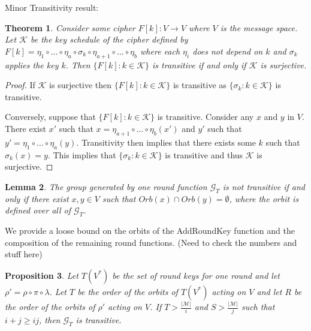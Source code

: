 \documentclass[11pt]{amsart}
\newcommand{\KK}{\mathcal{K}}
\newcommand{\MM}{\mathcal{M}}
\newcommand{\GG}{\mathcal{G}}
\newtheorem{theorem}{{\bf Theorem }}
\newtheorem{lemma}[theorem]{{\bf Lemma }}
\newtheorem{proposition}[theorem]{{\bf Proposition}}
\begin{document}
Minor Transitivity result:
\begin{theorem}
Consider some cipher $F[k]: V \to V$ where $V$ is the message space. Let $\KK$ be the key schedule of the cipher defined by $F[k] = \eta_1 \circ \dots \circ \eta_a \circ \sigma_k \circ \eta_{a+1} \circ \dots \circ \eta_b$ where each $\eta_i$ does not depend on $k$ and $\sigma_k$ applies the key $k$. Then $\{F[k]: k \in \KK\}$ is transitive if and only if $\KK$ is surjective.
\end{theorem}

\begin{proof}
If $\KK$ is surjective then $\{F[k]: k \in \KK\}$ is transitive as $\{\sigma_k : k \in \KK\}$ is transitive. \

Conversely, suppose that $\{F[k]: k \in \KK\}$ is transitive. Consider any $x$ and $y$ in $V$. There exist $x'$ such that $x = \eta_{a+1} \circ \dots \circ \eta_b(x')$ and $y'$ such that $y' = \eta_1 \circ \dots \circ \eta_a(y)$. Transitivity then implies that there exists some $k$ such that $\sigma_k(x) = y$. This implies that $\{\sigma_k : k \in \KK\}$ is transitive and thus $\KK$ is surjective.
\end{proof}

\begin{lemma}
The group generated by one round function $\GG_T$ is not transitive if and only if there exist $x,y \in V$ such that $Orb(x) \cap Orb(y) = \emptyset$, where the orbit is defined over all of $\GG_T$.
\end{lemma}

We provide a loose bound on the orbits of the AddRoundKey function and the composition of the remaining round functions. (Need to check the numbers and stuff here)

\begin{proposition}
Let $T(V^*)$ be the set of round keys for one round and let $\rho'=\rho \circ \pi \circ \lambda$. Let $T$ be the order of the orbits of $T(V^*)$ acting on $V$ and let $R$ be the order of the orbits of $\rho'$ acting on $V$. If $T > \frac{|\MM|}{i}$ and $S > \frac{|\MM|}{j}$ such that $i + j \geq ij$, then $\GG_T$ is transitive.
\end{proposition}
\end{document}
